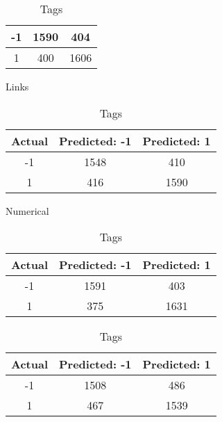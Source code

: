 \begin{table}[!htb]
\begin{minipage}{.5\linewidth}
\begin{tabular}{| c | c | c |}
			-1			& 1590			& 404			\\ \hline
			1			& 400			& 1606			\\ \hline
		\end{tabular}
	\end{minipage}%
	\begin{minipage}{.5\linewidth}
		\centering
		\caption{Links}
		\begin{tabular}{| c | c | c |}
			\hline
			Actual 		& Predicted: -1	& Predicted: 1	\\ \hline
			-1			& 1548			& 410			\\ \hline
			1			& 416			& 1590			\\ \hline
		\end{tabular}
	\end{minipage} 	
	\begin{minipage}{.5\linewidth}
		\centering
		\caption{Numerical}
		\begin{tabular}{| c | c | c |}
			\hline
			Actual 		& Predicted: -1	& Predicted: 1	\\ \hline
			-1			& 1591			& 403			\\ \hline
			1			& 375			& 1631			\\ \hline
		\end{tabular}
	\end{minipage}%
	\begin{minipage}{.5\linewidth}
		\caption{Tags}
		\centering
		\begin{tabular}{| c | c | c |}
			\hline
			Actual 		& Predicted: -1	& Predicted: 1	\\ \hline
			-1			& 1508			& 486			\\ \hline
			1			& 467			& 1539			\\ \hline
		\end{tabular}
	\end{minipage}
\end{table}	


